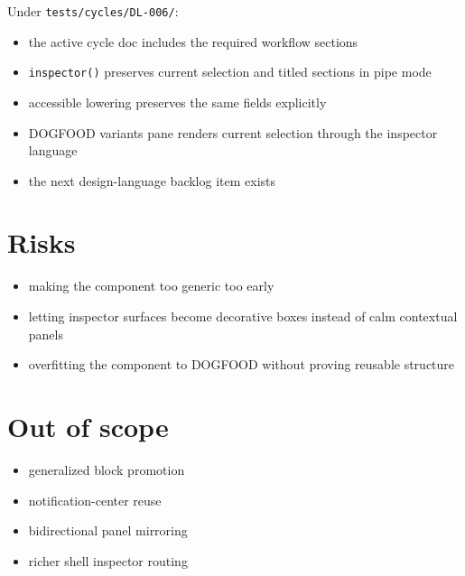 Under \texttt{t\allowbreak{}e\allowbreak{}s\allowbreak{}t\allowbreak{}s\allowbreak{}/\allowbreak{}c\allowbreak{}y\allowbreak{}c\allowbreak{}l\allowbreak{}e\allowbreak{}s\allowbreak{}/\allowbreak{}D\allowbreak{}L\allowbreak{}-\allowbreak{}0\allowbreak{}0\allowbreak{}6\allowbreak{}/}:

\begin{itemize}
\tightlist
\item
  the active cycle doc includes the required workflow sections
\item
  \texttt{i\allowbreak{}n\allowbreak{}s\allowbreak{}p\allowbreak{}e\allowbreak{}c\allowbreak{}t\allowbreak{}o\allowbreak{}r\allowbreak{}(\allowbreak{})} preserves current selection and titled sections in pipe mode
\item
  accessible lowering preserves the same fields explicitly
\item
  DOGFOOD variants pane renders current selection through the inspector language
\item
  the next design-language backlog item exists
\end{itemize}

\section{Risks}\label{record-173-risks}

\begin{itemize}
\tightlist
\item
  making the component too generic too early
\item
  letting inspector surfaces become decorative boxes instead of calm contextual panels
\item
  overfitting the component to DOGFOOD without proving reusable structure
\end{itemize}

\section{Out of scope}\label{record-173-out-of-scope}

\begin{itemize}
\tightlist
\item
  generalized block promotion
\item
  notification-center reuse
\item
  bidirectional panel mirroring
\item
  richer shell inspector routing
\end{itemize}

